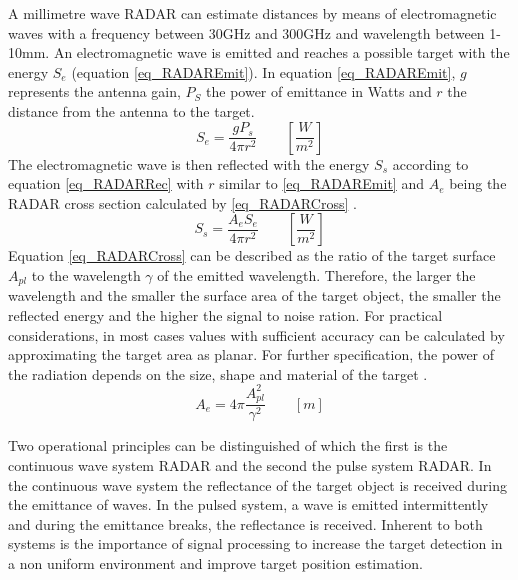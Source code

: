    A millimetre wave \ac{RADAR} can estimate distances by means of electromagnetic waves with a frequency between 30GHz and 300GHz and wavelength between 1-10mm. An electromagnetic wave is emitted and reaches a possible target with the energy $S_e$ (equation \ref{eq_RADAREmit}). In equation \ref{eq_RADAREmit}, $g$ represents the antenna gain, $P_S$ the power of emittance in Watts and $r$ the distance from the antenna to the target.  
   \begin{equation}
   \label{eq_RADAREmit}
   S_e=\frac{gP_s}{4\pi r^2} \quad \quad  [\frac{W}{m^2}] %
   \end{equation}
   The electromagnetic wave is then reflected with the energy $S_s$ according to equation \ref{eq_RADARRec} with $r$ similar to \ref{eq_RADAREmit} and $A_e$ being the RADAR cross section calculated by \ref{eq_RADARCross} \cite{Funk}. 
   \begin{equation}
   \label{eq_RADARRec}
   S_s=\frac{A_eS_e}{4\pi r^2} \quad \quad  [\frac{W}{m^2}]
   \end{equation}
   Equation \ref{eq_RADARCross} can be described as the ratio of the target surface $A_{pl}$ to the wavelength $\gamma$ of the emitted wavelength. Therefore, the larger the wavelength and the smaller the surface area of the target object, the smaller the reflected energy and the higher the signal to noise ration. For practical considerations, in most cases values with sufficient accuracy can be calculated by approximating the target area as planar\cite{Funk}. For further specification, the power of the radiation depends on the size, shape and material of the target \cite{EnvPerc}.
   \begin{equation}
   \label{eq_RADARCross}
   A_e=4\pi\frac{A_{pl}^2}{\gamma^2} \quad \quad  [m]
   \end{equation}
   
   Two operational principles can be distinguished of which the first is the continuous wave system RADAR and the second the pulse system RADAR. In the continuous wave system the reflectance of the target object is received during the emittance of waves. In the pulsed system, a wave is emitted intermittently and during the emittance breaks, the reflectance is received. Inherent to both systems is the importance of signal processing to increase the target detection in a non uniform environment and improve target position estimation. 
   
